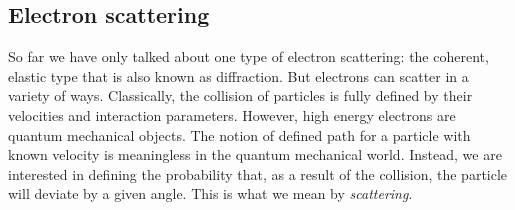 \subsection{Electron scattering}
\label{sec:scatter}

So far we have only talked about one type of electron scattering: the coherent, elastic type that is also known as diffraction. But electrons can scatter in a variety of ways.  Classically, the collision of particles is fully defined by their velocities and interaction parameters. However, high energy electrons are quantum mechanical objects. The notion of defined path for a particle with known velocity is meaningless in the quantum mechanical world. Instead, we are interested in defining the probability that, as a result of the collision, the particle will deviate by a given angle. This is what we mean by \textit{scattering}.

